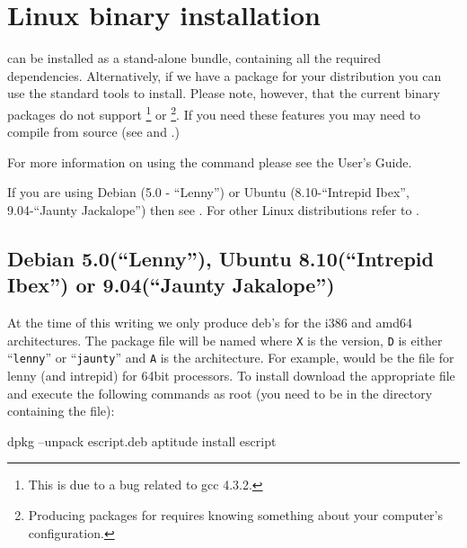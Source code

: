 %
%
%

\section{Linux binary installation}
\label{sec:binlinux}

\esfinley can be installed as a stand-alone bundle, containing all the required dependencies.
Alternatively, if we have a package for your distribution you can use the standard tools to install.
Please note, however, that the current binary packages do not support \openmp\footnote{This is due to a bug related to gcc 4.3.2.} or \mpi\footnote{Producing packages for \mpi requires knowing something about your computer's configuration.}.
If you need these features you may need to compile \esfinley from source (see  and .)

For more information on using the  command please see the User's Guide.

If you are using Debian (5.0 - ``Lenny'') or Ubuntu (8.10-``Intrepid Ibex'', 9.04-``Jaunty Jackalope'') then see .
For other Linux distributions refer to .

\subsection{Debian 5.0(``Lenny''), Ubuntu 8.10(``Intrepid Ibex'') or 9.04(``Jaunty Jakalope'')}\label{sec:debian}

At the time of this writing we only produce deb's for the i386 and amd64 architectures.
The package file will be named  where \texttt{X} is the version, \texttt{D} is either ``\texttt{lenny}'' or ``\texttt{jaunty}'' and \texttt{A} is the architecture.
For example,  would be the file for lenny (and intrepid) for 64bit processors.
To install \esfinley download the appropriate  file and execute the following commands as root (you need to be in the directory containing the file):
\begin{shellCode}
dpkg --unpack escript.deb
aptitude install escript
\end{shellCode}

